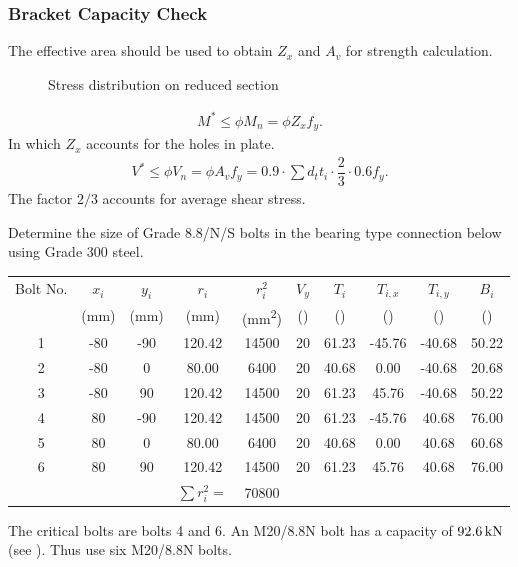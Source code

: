 \subsubsection{Bracket Capacity Check}
The effective area should be used to obtain $Z_x$ and $A_v$ for strength calculation.
\begin{figure}[H]
\centering
\caption{Stress distribution on reduced section}
\end{figure}
\begin{gather}
M^*\leqslant\phi{}M_n=\phi{}Z_xf_y.
\end{gather}
In which $Z_x$ accounts for the holes in plate.
\begin{gather}
V^*\leqslant\phi{}V_n=\phi{}A_vf_y=0.9\cdot\sum{}d_tt_i\cdot\dfrac{2}{3}\cdot0.6f_y.
\end{gather}
The factor $2/3$ accounts for average shear stress.
\begin{exmp}
Determine the size of Grade 8.8/N/S bolts in the bearing type connection below using Grade 300 steel.
\begin{figure}[H]

\end{figure}
\end{exmp}
\begin{solution}
\begin{center}
\begin{tabular}{cccccccccc}
	\toprule
	Bolt No. &   $x_i$    &   $y_i$    &     $r_i$      &   $r_i^2$    &   $V_y$    &   $T_i$    & $T_{i,x}$  & $T_{i,y}$  &   $B_i$    \\
	         & (\si{\mm}) & (\si{\mm}) &   (\si{\mm})   & (\si{\mm^2}) & (\si{\kn}) & (\si{\kn}) & (\si{\kn}) & (\si{\kn}) & (\si{\kn}) \\ \midrule
	   1     &    -80     &    -90     &     120.42     &    14500     &     20     &   61.23    &   -45.76   &   -40.68   &   50.22    \\
	   2     &    -80     &     0      &     80.00      &     6400     &     20     &   40.68    &    0.00    &   -40.68   &   20.68    \\
	   3     &    -80     &     90     &     120.42     &    14500     &     20     &   61.23    &   45.76    &   -40.68   &   50.22    \\
	   4     &     80     &    -90     &     120.42     &    14500     &     20     &   61.23    &   -45.76   &   40.68    &   76.00    \\
	   5     &     80     &     0      &     80.00      &     6400     &     20     &   40.68    &    0.00    &   40.68    &   60.68    \\
	   6     &     80     &     90     &     120.42     &    14500     &     20     &   61.23    &   45.76    &   40.68    &   76.00    \\ \bottomrule
	         &            &            & $\sum{}r_i^2=$ &    70800     &            &            &            &            &
\end{tabular}
\end{center}

The critical bolts are bolts 4 and 6.
An M20/8.8N bolt has a capacity of $\SI{92.6}{\kilo\newton}$ (see ).
Thus use six M20/8.8N bolts.
\end{solution}

